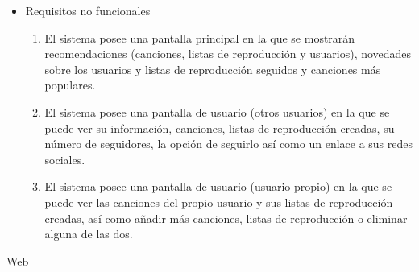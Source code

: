 \begin{itemize}
\item Requisitos no funcionales 

\begin{enumerate}
\item El sistema posee una pantalla principal en la que se mostrarán recomendaciones (canciones, listas de reproducción y usuarios), novedades sobre los usuarios y listas de reproducción seguidos y canciones más populares. 
\item El sistema posee una pantalla de usuario (otros usuarios) en la que se puede ver su información, canciones, listas de reproducción creadas, su número de seguidores, la opción de seguirlo así como un enlace a sus redes sociales.
\item El sistema posee una pantalla de usuario (usuario propio) en la que se puede ver las canciones del propio usuario y sus listas de reproducción creadas, así como añadir más canciones, listas de reproducción o eliminar alguna de las dos.
\end{enumerate}
\end{itemize}

Web

